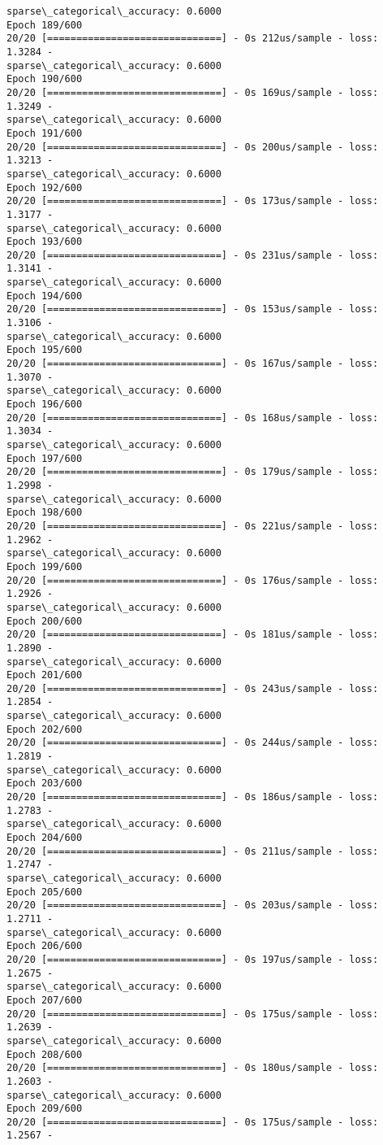 \documentclass[11pt]{article}
\begin{document}
\begin{Verbatim}[commandchars=\\\{\}]
sparse\_categorical\_accuracy: 0.6000
Epoch 189/600
20/20 [==============================] - 0s 212us/sample - loss: 1.3284 -
sparse\_categorical\_accuracy: 0.6000
Epoch 190/600
20/20 [==============================] - 0s 169us/sample - loss: 1.3249 -
sparse\_categorical\_accuracy: 0.6000
Epoch 191/600
20/20 [==============================] - 0s 200us/sample - loss: 1.3213 -
sparse\_categorical\_accuracy: 0.6000
Epoch 192/600
20/20 [==============================] - 0s 173us/sample - loss: 1.3177 -
sparse\_categorical\_accuracy: 0.6000
Epoch 193/600
20/20 [==============================] - 0s 231us/sample - loss: 1.3141 -
sparse\_categorical\_accuracy: 0.6000
Epoch 194/600
20/20 [==============================] - 0s 153us/sample - loss: 1.3106 -
sparse\_categorical\_accuracy: 0.6000
Epoch 195/600
20/20 [==============================] - 0s 167us/sample - loss: 1.3070 -
sparse\_categorical\_accuracy: 0.6000
Epoch 196/600
20/20 [==============================] - 0s 168us/sample - loss: 1.3034 -
sparse\_categorical\_accuracy: 0.6000
Epoch 197/600
20/20 [==============================] - 0s 179us/sample - loss: 1.2998 -
sparse\_categorical\_accuracy: 0.6000
Epoch 198/600
20/20 [==============================] - 0s 221us/sample - loss: 1.2962 -
sparse\_categorical\_accuracy: 0.6000
Epoch 199/600
20/20 [==============================] - 0s 176us/sample - loss: 1.2926 -
sparse\_categorical\_accuracy: 0.6000
Epoch 200/600
20/20 [==============================] - 0s 181us/sample - loss: 1.2890 -
sparse\_categorical\_accuracy: 0.6000
Epoch 201/600
20/20 [==============================] - 0s 243us/sample - loss: 1.2854 -
sparse\_categorical\_accuracy: 0.6000
Epoch 202/600
20/20 [==============================] - 0s 244us/sample - loss: 1.2819 -
sparse\_categorical\_accuracy: 0.6000
Epoch 203/600
20/20 [==============================] - 0s 186us/sample - loss: 1.2783 -
sparse\_categorical\_accuracy: 0.6000
Epoch 204/600
20/20 [==============================] - 0s 211us/sample - loss: 1.2747 -
sparse\_categorical\_accuracy: 0.6000
Epoch 205/600
20/20 [==============================] - 0s 203us/sample - loss: 1.2711 -
sparse\_categorical\_accuracy: 0.6000
Epoch 206/600
20/20 [==============================] - 0s 197us/sample - loss: 1.2675 -
sparse\_categorical\_accuracy: 0.6000
Epoch 207/600
20/20 [==============================] - 0s 175us/sample - loss: 1.2639 -
sparse\_categorical\_accuracy: 0.6000
Epoch 208/600
20/20 [==============================] - 0s 180us/sample - loss: 1.2603 -
sparse\_categorical\_accuracy: 0.6000
Epoch 209/600
20/20 [==============================] - 0s 175us/sample - loss: 1.2567 -

\end{Verbatim}
\end{document}
